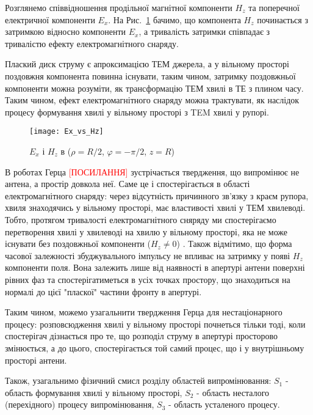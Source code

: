 Розглянемо співвідношення продільної магнітної компоненти $ H_z $ та 
поперечної електричної компоненти $ E_x $. На Рис.~\ref{fig:ex_vs_hz}
бачимо, що компонента $ H_z $ починається з затримкою відносно компоненти 
$ E_x $, а тривалість затримки співпадає з тривалістю ефекту 
електромагнітного снаряду. 

Плаский диск струму є апроксимацією ТЕМ джерела, а у вільному просторі 
поздовжня компонента повинна існувати, таким чином, затримку поздовжньої 
компоненти можна розуміти, як трансформацію ТЕМ хвилі в ТЕ з плином 
часу. Таким чином, ефект електромагнітного снаряду можна трактувати, як 
наслідок процесу формування хвилі у вільному просторі з TEM хвилі у рупорі.

\begin{figure}[h] \begin{center}
\texttt{[image: Ex\_vs\_Hz]}
\caption{$E_x$ і $H_z$ в ($\rho = R/2$, $\varphi = -\pi/2$, $z = R$)} 
\label{fig:ex_vs_hz}
\end{center} \end{figure}

В роботах Герца \textcolor{red}{[ПОСИЛАННЯ]} зустрічається твердження, що 
випромінює не антена, а простір довкола неї. Саме це і спостерігається в 
області електромагнітного снаряду: через відсутність причинного зв'язку з 
краєм рупора, хвиля знаходячись у вільному просторі, має властивості хвилі у 
ТЕМ хвилеводі. Тобто, протягом тривалості електромагнітного сняряду ми 
спостерігаємо перетворення хвилі у хвилеводі на хвилю у вільному просторі, 
яка не може існувати без поздовжньої компоненти ($ H_z \neq 0 $) 
\cite{imp:Borisov1991, imp:Harmuth1985}. Також відмітимо, що форма часової 
залежності збуджувального імпульсу не впливає на затримку у появі $ H_z $
компоненти поля. Вона залежить лише від наявності в апертурі антени
поверхні рівних фаз та спостерігатиметься в усіх точках простору, що 
знаходиться на нормалі до цієї "пласкої" частини фронту в апертурі.

Таким чином, можемо узагальнити твердження Герца для нестаціонарного 
процесу: розповсюдження хвилі у вільному просторі почнеться тільки тоді, 
коли спостерігач дізнається про те, що розподіл струму в апертурі просторово
змінюється, а до цього, спостерігається той самий процес, що і у 
внутрішньому просторі антени. 


Також, узагальнимо фізичний смисл розділу областей випромінювання: 
$ S_1 $ - область формування хвилі у вільному просторі, $ S_2 $ - область 
несталого (перехідного) процесу випромінювання, $ S_3 $ - область
усталеного процесу.

